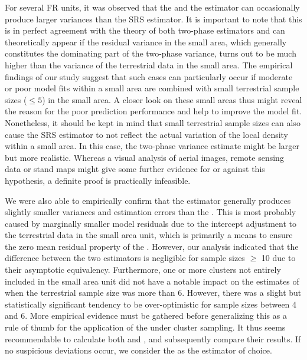 For several FR units, it was observed that the \psmall{} and the \extpsynth{} estimator can occasionally produce larger variances than the SRS estimator. It is important to note that this is in perfect agreement with the theory of both two-phase estimators and can theoretically appear if the residual variance in the small area, which generally constitutes the dominating part of the two-phase variance, turns out to be much higher than the variance of the terrestrial data in the small area. The empirical findings of our study suggest that such cases can particularly occur if moderate or poor model fits within a small area are combined with small terrestrial sample sizes ($\leq 5$) in the small area. A closer look on these small areas thus might reveal the reason for the poor prediction performance and help to improve the model fit. Nonetheless, it should be kept in mind that small terrestrial sample sizes can also cause the SRS estimator to not reflect the actual variation of the local density within a small area. In this case, the two-phase variance estimate might be larger but more realistic. Whereas a visual analysis of aerial images, remote sensing data or stand maps might give some further evidence for or against this hypothesis, a definite proof is practically infeasible.\par

We were also able to empirically confirm that the \extpsynth{} estimator generally produces slightly smaller variances and estimation errors than the \psmall{}. This is most probably caused by marginally smaller model residuals due to the intercept adjustment to the terrestrial data in the small area unit, which is primarily a means to ensure the zero mean residual property of the \extpsynth{}. However, our analysis indicated that the difference between the two estimators is negligible for sample sizes $\geq$ 10 due to their asymptotic equivalency. Furthermore, one or more clusters not entirely included in the small area unit did not have a notable impact on the estimates of \extpsynth{} when the terrestrial sample size was more than 6. However, there was a slight but statistically significant tendency to be over-optimistic for sample sizes between 4 and 6. More empirical evidence must be gathered before generalizing this as a rule of thumb for the application of the \extpsynth{} under cluster sampling. It thus seems recommendable to calculate both \psmall{} and \extpsynth{}, and subsequently compare their results. If no suspicious deviations occur, we consider the \extpsynth{} as the estimator of choice.\par

